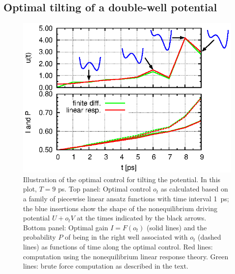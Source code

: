\documentclass[]{tMPH2e}
\begin{document}
\subsection{Optimal tilting of a double-well potential}
\begin{figure}
  \centering
  \includegraphics[]{figs/fig-ctr-stat-2.eps}
  \caption{Illustration of the optimal control for tilting the potential.  
    In this plot, $T=9$ ps.  Top panel: Optimal control $o_t$ as calculated based on a family of piecewise linear ansatz functions with time interval 1~ps; the blue insertions show the shape of the nonequilibrium driving potential $U + o_t V$ at the times indicated by the black arrows. Bottom panel: Optimal gain $I=F(o_t)$ (solid lines) and the probability $P$ of being in the right well associated with $o_t$ (dashed lines) as functions of time along the optimal control. Red lines: computation using   the nonequilibrium linear response theory. Green lines: brute force computation as described in the text. }\label{fig:tmp7}
\end{figure}
\end{document}
